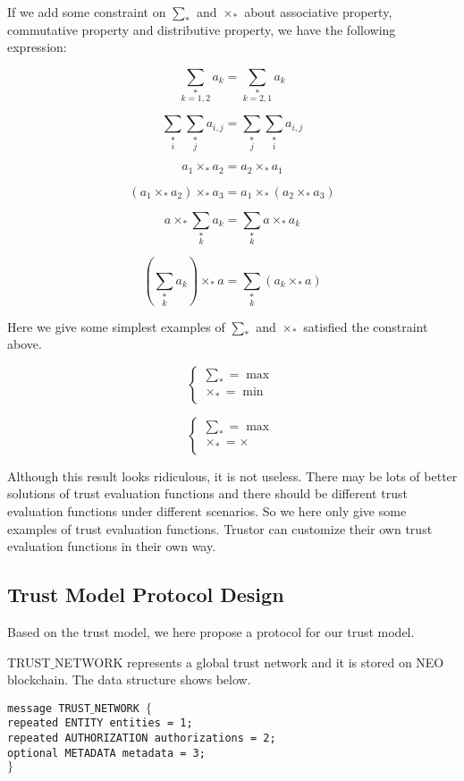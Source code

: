 \documentclass{article}
\begin{document}
If we add some constraint on \(\sum _*\) and \(\times _*\) about associative property, commutative property and distributive property, we have the
following expression:

\[\underset{k=1,2}{\sum _*}a_k=\underset{k=2,1}{\sum _*}a_k\]

\[\underset{i}{\sum _*}\underset{j}{\sum _*}a_{i,j}=\underset{j}{\sum _*}\underset{i}{\sum _*}a_{i,j}\]

\[a_1\times _*a_2=a_2\times _*a_1\]

\[\left(a_1\times _*a_2\right)\times _*a_3=a_1\times _*\left(a_2\times _*a_3\right)\]

\[a\times _*\underset{k}{\sum _*}a_k=\underset{k}{\sum _*}a\times _*a_k\]

\[\left(\underset{k}{\sum _*}a_k\right)\times _*a=\underset{k}{\sum _*}\left(a_k\times _*a\right)\]

Here we give some simplest examples of { }\(\sum _*\) and \(\times _*\) satisfied the constraint above.

\[\left\{
\begin{array}{c}
 \sum _*=\max  \\
 \times _*=\min  \\
\end{array}
\right.\]

\[\left\{
\begin{array}{c}
 \sum _*=\max  \\
 \times _*=\times  \\
\end{array}
\right.\]

Although this result looks ridiculous, it is not useless. There may be lots of better solutions of trust evaluation functions and there should be
different trust evaluation functions under different scenarios. So we here only give some examples of trust evaluation functions. Trustor can customize
their own trust evaluation functions in their own way.


\subsection{Trust Model Protocol Design}

Based on the trust model, we here propose a protocol for our trust model.

TRUST$\_$NETWORK represents a global trust network and it is stored on NEO blockchain. The data structure shows below.


\texttt{message TRUST$\_$NETWORK $\{$\\
\hspace*{2.ex} repeated ENTITY entities = 1;\\
\hspace*{2.ex} repeated AUTHORIZATION authorizations = 2;\\
\hspace*{2.ex} optional METADATA metadata = 3;\\
$\}$}
\end{document}
